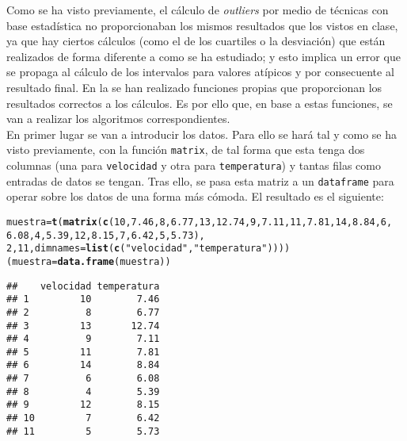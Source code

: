 \documentclass[12pt]{report}\usepackage[]{graphicx}\usepackage[dvipsnames]{xcolor}
\makeatletter
\newcommand{\hlnum}[1]{\textcolor[rgb]{0.686,0.059,0.569}{#1}}%
\newcommand{\hlstr}[1]{\textcolor[rgb]{0.192,0.494,0.8}{#1}}%
\newcommand{\hlstd}[1]{\textcolor[rgb]{0.345,0.345,0.345}{#1}}%
\newcommand{\hlkwb}[1]{\textcolor[rgb]{0.69,0.353,0.396}{#1}}%
\newcommand{\hlkwc}[1]{\textcolor[rgb]{0.333,0.667,0.333}{#1}}%
\newcommand{\hlkwd}[1]{\textcolor[rgb]{0.737,0.353,0.396}{\textbf{#1}}}%
\newenvironment{kframe}{%
 \def\at@end@of@kframe{}%
 \ifinner\ifhmode%
  \def\at@end@of@kframe{\end{minipage}}%
  \begin{minipage}{\columnwidth}%
 \fi\fi%
 \def\FrameCommand##1{\hskip\@totalleftmargin \hskip-\fboxsep
 \colorbox{shadecolor}{##1}\hskip-\fboxsep
     \hskip-\linewidth \hskip-\@totalleftmargin \hskip\columnwidth}%
 \MakeFramed {\advance\hsize-\width
   \@totalleftmargin\z@ \linewidth\hsize
   \@setminipage}}%
 {\par\unskip\endMakeFramed%
 \at@end@of@kframe}
\newenvironment{knitrout}{}{} %
\makeatother
\begin{document}
				Como se ha visto previamente, el cálculo de \textit{outliers} por medio de técnicas con base estadística no proporcionaban los mismos resultados que los vistos en clase, ya que hay ciertos cálculos (como el de los cuartiles o la desviación) que están realizados de forma diferente a como se ha estudiado; y esto implica un error que se propaga al cálculo de los intervalos para valores atípicos y por consecuente al resultado final.  En la  se han realizado funciones propias que proporcionan los resultados correctos a los cálculos. Es por ello que, en base a estas funciones, se van a realizar los algoritmos correspondientes.\\
				
				En primer lugar se van a introducir los datos. Para ello se hará tal y como se ha visto previamente, con la función \texttt{matrix}, de tal forma que esta tenga dos columnas (una para \texttt{velocidad} y otra para \texttt{temperatura}) y tantas filas como entradas de datos se tengan. Tras ello, se pasa esta matriz a un \texttt{dataframe} para operar sobre los datos de una forma más cómoda. El resultado es el siguiente: 
				
\begin{knitrout}
\color{fgcolor}\begin{kframe}
\begin{alltt}
\hlstd{muestra} \hlkwb{=} \hlkwd{t}\hlstd{(}\hlkwd{matrix}\hlstd{(}\hlkwd{c}\hlstd{(}\hlnum{10}\hlstd{,}\hlnum{7.46}\hlstd{,}\hlnum{8}\hlstd{,}\hlnum{6.77}\hlstd{,}\hlnum{13}\hlstd{,}\hlnum{12.74}\hlstd{,}\hlnum{9}\hlstd{,}\hlnum{7.11}\hlstd{,}\hlnum{11}\hlstd{,}\hlnum{7.81}\hlstd{,}\hlnum{14}\hlstd{,}\hlnum{8.84}\hlstd{,}\hlnum{6}\hlstd{,}
\hlnum{6.08}\hlstd{,}\hlnum{4}\hlstd{,}\hlnum{5.39}\hlstd{,}\hlnum{12}\hlstd{,}\hlnum{8.15}\hlstd{,}\hlnum{7}\hlstd{,}\hlnum{6.42}\hlstd{,}\hlnum{5}\hlstd{,}\hlnum{5.73}\hlstd{),}
\hlnum{2}\hlstd{,}\hlnum{11}\hlstd{,}\hlkwc{dimnames}\hlstd{=}\hlkwd{list}\hlstd{(}\hlkwd{c}\hlstd{(}\hlstr{"velocidad"}\hlstd{,}\hlstr{"temperatura"}\hlstd{))))}
\hlstd{(muestra}\hlkwb{=}\hlkwd{data.frame}\hlstd{(muestra))}
\end{alltt}
\begin{verbatim}
##    velocidad temperatura
## 1         10        7.46
## 2          8        6.77
## 3         13       12.74
## 4          9        7.11
## 5         11        7.81
## 6         14        8.84
## 7          6        6.08
## 8          4        5.39
## 9         12        8.15
## 10         7        6.42
## 11         5        5.73
\end{verbatim}
\end{kframe}
\end{knitrout}
				
\end{document}

